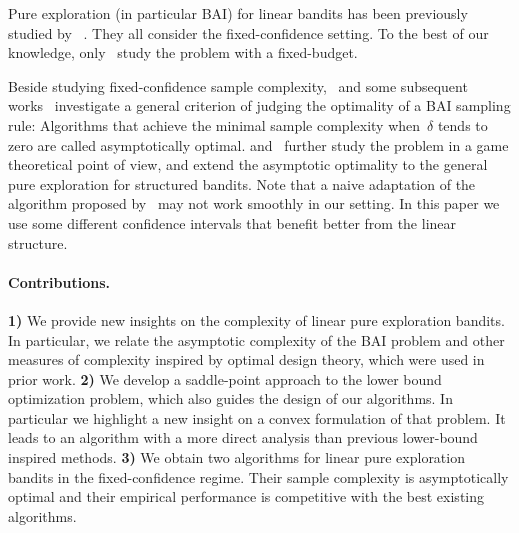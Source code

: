 Pure exploration (in particular BAI) for linear bandits has been previously studied by
~\citet{soare2014linear,tao2018alba,xu2018linear,zaki2019maxoverlap,fiez2019transductive,kazerouni2019glb}. They all consider the fixed-confidence setting. To the best of our knowledge, only~\citet{hoffman2014bayesgap} study the problem with a fixed-budget.

Beside studying fixed-confidence sample complexity,~\citet{garivier2016tracknstop} and some subsequent works~\citep{qin2017ttei,shang2020t3c} investigate a general criterion of judging the optimality of a BAI sampling rule: Algorithms that achieve the minimal sample complexity when~$\delta$ tends to zero are called asymptotically optimal. \citet{menard2019lma} and~\citet{degenne2019game} further study the problem in a game theoretical point of view, and extend the asymptotic optimality to the general pure exploration for structured bandits. Note that a naive adaptation of the algorithm proposed by~\citet{degenne2019game} may not work smoothly in our setting. In this paper we use some different confidence intervals that benefit better from the linear structure.

\paragraph{Contributions.}
\textbf{1)}
We provide new insights on the complexity of linear pure exploration bandits. In particular, we relate the asymptotic complexity of the BAI problem and other measures of complexity inspired by optimal design theory, which were used in prior work.
\textbf{2)}
We develop a saddle-point approach to the lower bound optimization problem, which also guides the design of our algorithms. In particular we highlight a new insight on a convex formulation of that problem. It leads to an algorithm with a more direct analysis than previous lower-bound inspired methods.
\textbf{3)}
We obtain two algorithms for linear pure exploration bandits in the fixed-confidence regime. Their sample complexity is asymptotically optimal and their empirical performance is competitive with the best existing algorithms.

%
%
%
